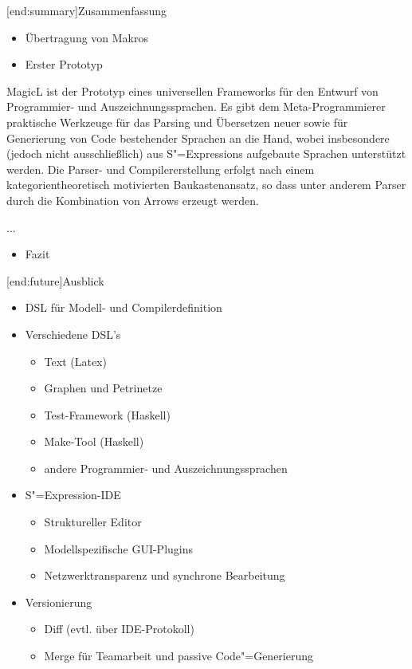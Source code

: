 \documentclass[a4paper, bibgerm]{book}
\newcommand\lsection{}
\newcommand{\sexp}{S"=Expression}
\newcommand{\sexps}{S"=Expressions}
\newcommand{\cgen}{Code"=Generierung}
\begin{document}
\lsection[end:summary]{Zusammenfassung}

\begin{itemize}
\item Übertragung von Makros
\item Erster Prototyp
\end{itemize}

MagicL ist der Prototyp eines
universellen Frameworks für den Entwurf von Programmier- und
Auszeichnungssprachen. Es gibt dem Meta-Programmierer praktische
Werkzeuge für das Parsing und Übersetzen neuer sowie für Generierung von
Code bestehender Sprachen an die Hand, wobei insbesondere (jedoch
nicht ausschließlich) aus \sexps{} aufgebaute Sprachen unterstützt
werden. Die Parser- und Compilererstellung erfolgt nach einem
kategorientheoretisch motivierten Baukastenansatz, so dass
unter anderem Parser durch die Kombination von Arrows erzeugt werden.

...

\begin{itemize}
\item Fazit
\end{itemize}

\lsection[end:future]{Ausblick}
\begin{itemize}
\item DSL für Modell- und Compilerdefinition
\item Verschiedene DSL's
  \begin{itemize}
  \item Text (Latex)
  \item Graphen und Petrinetze
  \item Test-Framework (Haskell)
  \item Make-Tool (Haskell)
  \item andere Programmier- und Auszeichnungssprachen
  \end{itemize}
\item \sexp{}-IDE
  \begin{itemize}
  \item Struktureller Editor
  \item Modellspezifische GUI-Plugins
  \item Netzwerktransparenz und synchrone Bearbeitung
  \end{itemize}
\item Versionierung
  \begin{itemize}
  \item Diff (evtl. über IDE-Protokoll)
  \item Merge für Teamarbeit und passive \cgen{}
  \end{itemize}
\end{itemize}



\end{document}
